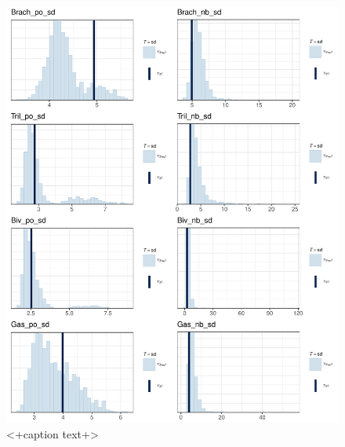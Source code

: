 \documentclass[12pt,letterpaper]{article}
\begin{document}
\begin{figure}[ht]
  \centering
  \includegraphics[width=\textwidth,height=0.5\textheight,keepaspectratio=true]{figure/ppc_sd}
  \caption{<+caption text+>}
  \label{fig:<+label+>}
\end{figure}
\end{document}
